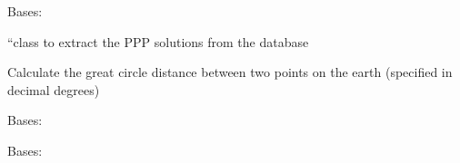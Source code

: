 \documentclass[letterpaper,10pt,english]{sphinxmanual}
\begin{document}

\begin{fulllineitems}
\label{\detokenize{classes:classes.pyETM.PppSoln}}
\pysigstartsignatures
{}
\pysigstopsignatures
\sphinxAtStartPar
Bases: 

\sphinxAtStartPar
“class to extract the PPP solutions from the database

\end{fulllineitems}


\begin{fulllineitems}
\label{\detokenize{classes:classes.pyETM.distance}}
\pysigstartsignatures
{}
\pysigstopsignatures
\sphinxAtStartPar
Calculate the great circle distance between two points
on the earth (specified in decimal degrees)

\end{fulllineitems}


\begin{fulllineitems}
\label{\detokenize{classes:classes.pyETM.pyETMException}}
\pysigstartsignatures
{}
\pysigstopsignatures
\sphinxAtStartPar
Bases: 

\end{fulllineitems}


\begin{fulllineitems}
\label{\detokenize{classes:classes.pyETM.pyETMException_Model}}
\pysigstartsignatures
{}
\pysigstopsignatures
\sphinxAtStartPar
Bases: {\hyperref[\detokenize{classes:classes.pyETM.pyETMException}]{}}

\end{fulllineitems}
\end{document}
